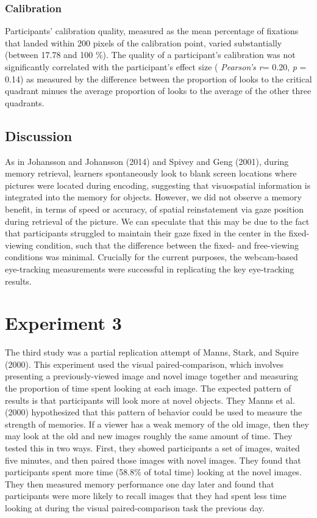 \documentclass[
  man,floatsintext]{apa6}
\begin{document}
\subsubsection{Calibration}\label{calibration-2}

Participants' calibration quality, measured as the mean percentage of fixations that landed within 200 pixels of the calibration point, varied substantially (between 17.78 and 100 \%).
The quality of a participant's calibration was not significantly correlated with the participant's effect size ( \emph{Pearson's r}= 0.20, \emph{p} = 0.14) as measured by the difference between the proportion of looks to the critical quadrant minues the average proportion of looks to the average of the other three quadrants.

\subsection{Discussion}\label{discussion-1}

As in Johansson and Johansson (2014) and Spivey and Geng (2001), during memory retrieval, learners spontaneously look to blank screen locations where pictures were located
during encoding, suggesting that visuospatial information is integrated into the memory
for objects. However, we did not observe a memory benefit, in terms of speed or accuracy, of spatial reinstatement via gaze position during retrieval of the picture. We can speculate that this may be due to the fact that participants struggled to maintain their gaze fixed in the center in the fixed-viewing condition, such that the difference between the fixed- and free-viewing conditions was minimal. Crucially for the current purposes, the webcam-based eye-tracking measurements were successful in replicating the key eye-tracking results.

\section{Experiment 3}\label{experiment-3}

The third study was a partial replication attempt of
Manns, Stark, and Squire (2000). This experiment used the visual
paired-comparison, which involves presenting a previously-viewed image
and novel image together and measuring the proportion of time spent
looking at each image. The expected pattern of results is that
participants will look more at novel objects. They
Manns et al. (2000) hypothesized that this pattern of
behavior could be used to measure the strength of memories. If a viewer
has a weak memory of the old image, then they may look at the old and
new images roughly the same amount of time. They tested this in two
ways. First, they showed participants a set of images, waited five
minutes, and then paired those images with novel images. They found that
participants spent more time (58.8\% of total time) looking at the novel
images. They then measured memory performance one day later and found
that participants were more likely to recall images that they had spent
less time looking at during the visual paired-comparison task the
previous day.
\end{document}
